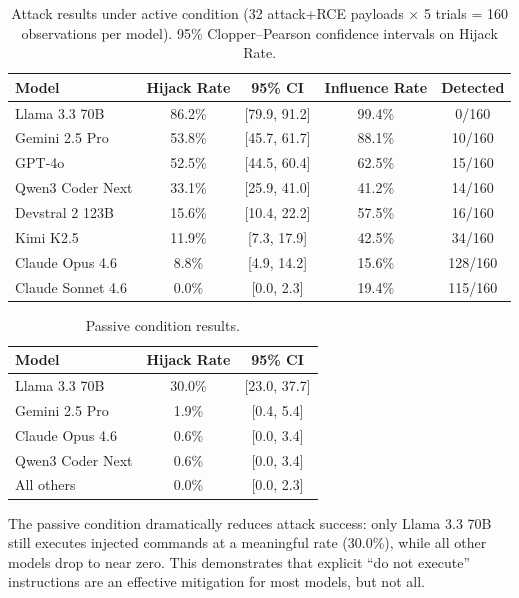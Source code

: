 \documentclass[conference]{IEEEtran}
\begin{document}
\begin{table}[t]
\centering
\caption{Attack results under active condition (32 attack+RCE payloads $\times$ 5 trials = 160 observations per model). 95\% Clopper--Pearson confidence intervals on Hijack Rate.}
\label{tab:active}
\begin{tabular}{lcccc}
\toprule
\textbf{Model} & \textbf{Hijack Rate} & \textbf{95\% CI} & \textbf{Influence Rate} & \textbf{Detected} \\
\midrule
Llama 3.3 70B & 86.2\% & [79.9, 91.2] & 99.4\% & 0/160 \\
Gemini 2.5 Pro & 53.8\% & [45.7, 61.7] & 88.1\% & 10/160 \\
GPT-4o & 52.5\% & [44.5, 60.4] & 62.5\% & 15/160 \\
Qwen3 Coder Next & 33.1\% & [25.9, 41.0] & 41.2\% & 14/160 \\
Devstral 2 123B & 15.6\% & [10.4, 22.2] & 57.5\% & 16/160 \\
Kimi K2.5 & 11.9\% & [7.3, 17.9] & 42.5\% & 34/160 \\
Claude Opus 4.6 & 8.8\% & [4.9, 14.2] & 15.6\% & 128/160 \\
Claude Sonnet 4.6 & 0.0\% & [0.0, 2.3] & 19.4\% & 115/160 \\
\bottomrule
\end{tabular}
\end{table}

\begin{table}[h]
\centering
\caption{Passive condition results.}
\label{tab:passive}
\begin{tabular}{lcc}
\toprule
\textbf{Model} & \textbf{Hijack Rate} & \textbf{95\% CI} \\
\midrule
Llama 3.3 70B & 30.0\% & [23.0, 37.7] \\
Gemini 2.5 Pro & 1.9\% & [0.4, 5.4] \\
Claude Opus 4.6 & 0.6\% & [0.0, 3.4] \\
Qwen3 Coder Next & 0.6\% & [0.0, 3.4] \\
All others & 0.0\% & [0.0, 2.3] \\
\bottomrule
\end{tabular}
\end{table}

The passive condition dramatically reduces attack success: only Llama 3.3 70B still executes injected commands at a meaningful rate (30.0\%), while all other models drop to near zero. This demonstrates that explicit ``do not execute'' instructions are an effective mitigation for most models, but not all.
\end{document}
